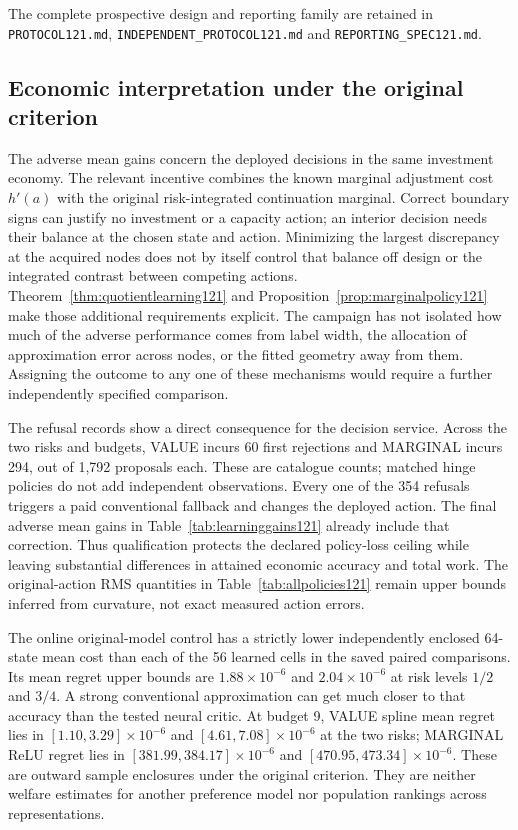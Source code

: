 The complete prospective design and reporting family are
retained in \texttt{PROTOCOL121.md}, \texttt{INDEPENDENT\_PROTOCOL121.md} and
\texttt{REPORTING\_SPEC121.md}.



\subsection{Economic interpretation under the original criterion}
\label{subsec:interpretation121}

The adverse mean gains concern the deployed decisions in the same investment
economy. The relevant incentive combines the known marginal adjustment cost
$h'(a)$ with the original risk-integrated continuation marginal. Correct
boundary signs can justify no investment or a capacity action; an interior
decision needs their balance at the chosen state and action. Minimizing the
largest discrepancy at the acquired nodes does not by itself control that
balance off design or the integrated contrast between competing actions.
Theorem~\ref{thm:quotientlearning121} and
Proposition~\ref{prop:marginalpolicy121} make those additional requirements
explicit. The campaign has not isolated how much of the adverse performance
comes from label width, the allocation of approximation error across nodes,
or the fitted geometry away from them. Assigning the outcome to any one of
these mechanisms would require a further independently specified comparison.

The refusal records show a direct consequence for the decision service.
Across the two risks and budgets, VALUE incurs 60 first rejections and
MARGINAL incurs 294, out of 1,792 proposals each. These are catalogue counts;
matched hinge policies do not add independent observations. Every one of the
354 refusals triggers a paid conventional fallback and changes the deployed
action. The final adverse mean gains in Table~\ref{tab:learninggains121}
already include that correction. Thus qualification protects the declared
policy-loss ceiling while leaving substantial differences in attained
economic accuracy and total work. The original-action RMS quantities in
Table~\ref{tab:allpolicies121} remain upper bounds inferred from curvature,
not exact measured action errors.

The online original-model control has a strictly lower independently enclosed
64-state mean cost than each of the 56 learned cells in the saved paired
comparisons. Its mean regret upper bounds are $1.88\times10^{-6}$ and
$2.04\times10^{-6}$ at risk levels $1/2$ and $3/4$. A strong conventional
approximation can get much closer to that accuracy than the tested neural
critic. At budget 9, VALUE spline mean regret lies in
$[1.10,3.29]\times10^{-6}$ and $[4.61,7.08]\times10^{-6}$ at the two risks;
MARGINAL ReLU regret lies in $[381.99,384.17]\times10^{-6}$ and
$[470.95,473.34]\times10^{-6}$. These are outward sample enclosures under
the original criterion. They are neither welfare estimates for another
preference model nor population rankings across representations.

